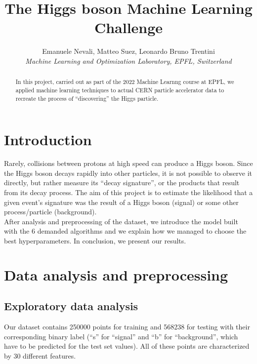 \documentclass[10pt,conference,compsocconf]{IEEEtran}
\begin{document}
\title{The Higgs boson Machine Learning Challenge}

\author{
  Emanuele Nevali, Matteo Suez, Leonardo Bruno Trentini\\
  \textit{Machine Learning and Optimization Laboratory, EPFL, Switzerland}
}

\maketitle

\begin{abstract}
In this project, carried out as part of the 2022 Machine Learnng course at EPFL, we applied machine learning techniques to actual CERN particle accelerator data to recreate the process of
“discovering” the Higgs particle.\\
\end{abstract}

\section{Introduction}
Rarely, collisions between protons at high speed can produce a Higgs boson. Since the Higgs boson decays rapidly into other particles, it is not possible to observe it directly, but rather measure its “decay signature”, or the products that result from its decay process. The aim of this project is to estimate the likelihood that a given event’s signature was the result of a Higgs boson (signal) or some other process/particle (background).\\
After analysis and preprocessing of the dataset, we introduce the model built with the 6 demanded algorithms and we explain how we managed to choose the best hyperparameters. In conclusion, we present our results.

\section{Data analysis and preprocessing}

\subsection{Exploratory data analysis}
Our dataset contains 250000 points for training and 568238
for testing with their corresponding binary label (“s” for “signal” and “b” for “background”, which have to be predicted for the test set values). All of these points are characterized by 30 different features. \\
\vspace{-0.8cm}\\
\end{document}
